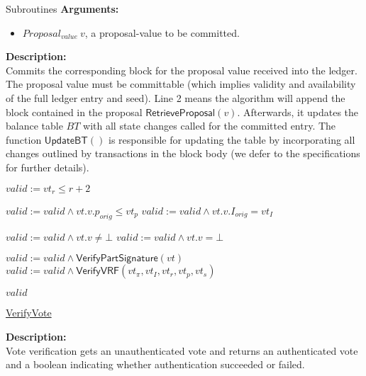 \documentclass[10pt,a4paper]{article}
\begin{document}
\begin{section}{Subroutines}
\noindent \textbf{Arguments:}
\begin{itemize}
    \item $Proposal_{value} \ v$, a proposal-value to be committed.
  \end{itemize}

\noindent \textbf{Description:}\\
Commits the corresponding block for the proposal value received into the ledger.
The proposal value must be committable (which implies validity and availability of the full
ledger entry and seed).
Line 2 means the algorithm will append the block contained in the proposal $\mathsf{RetrieveProposal}(v)$.
Afterwards, it updates the balance table $BT$ with all state changes called for the committed entry.
The function $\mathsf{UpdateBT}()$ is responsible for updating the table by incorporating all changes
outlined by transactions in the block body (we defer to the specifications for further details). 


\begin{algorithm}[H]\label{algo:verify-vote}
    \begin{algorithmic}[1]
        \State $valid := vt_r \leq r+2$
        
            \State $valid := valid \land vt.v.p_{orig} \leq vt_p$
                \State $valid := valid \land vt.v.I_{orig} = vt_I$
            \EndIf
        \EndIf
        
            \State $valid := valid \land vt.v \neq \bot$
            \State $valid := valid \land vt.v = \bot$
        \EndIf

        \State $valid := valid \land \mathsf{VerifyPartSignature}(vt)$
        \State $valid := valid \land \mathsf{VerifyVRF}(vt_{\pi}, vt_I, vt_r, vt_p, vt_s)$

        \Return $valid$
    \EndFunction
    \end{algorithmic}
    \caption{\underline{VerifyVote}}
\end{algorithm}

\noindent \textbf{Description:}\\
Vote verification gets an unauthenticated vote and returns an authenticated vote and a
boolean indicating whether authentication succeeded or failed.


\end{section}
\end{document}

